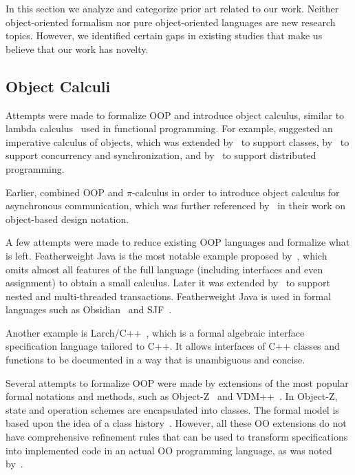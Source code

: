 
In this section we analyze and categorize prior art related to our work.
Neither object-oriented formalism nor pure object-oriented languages are new research topics.
However, we identified certain gaps in existing studies that make us believe that our work has novelty.

\subsection{Object Calculi}

Attempts were made to formalize OOP and introduce object calculus, similar to lambda calculus~\citep{barendregt2012} used in functional programming.
For example, \citet{abadi1995imperative} suggested an imperative calculus of objects, which was extended by~\citet{bono1998imperative} to support classes, by~\citet{gordon1998concurrent} to support concurrency and synchronization, and by~\citet{jeffrey1999distributed} to support distributed programming.

Earlier, \citet{honda1991object} combined OOP and \(\pi\)-calculus in order to introduce object calculus for asynchronous communication, which was further referenced by~\citet{jones1993pi} in their work on object-based design notation.

A few attempts were made to reduce existing OOP languages and formalize what is left.
Featherweight Java is the most notable example proposed by~\citet{igarashi2001featherweight}, which omits almost all features of the full language (including interfaces and even assignment) to obtain a small calculus.
Later it was extended by~\citet{jagannathan2005transactional} to support nested and multi-threaded transactions.
Featherweight Java is used in formal languages such as Obsidian~\citep{coblenz2019} and SJF~\citep{usov2020}.

Another example is Larch/C++~\citep{cheon1994quick}, which is a formal algebraic interface specification language tailored to C++.
It allows interfaces of C++ classes and functions to be documented in a way that is unambiguous and concise.

Several attempts to formalize OOP were made by extensions of the most popular formal notations and methods, such as Object-Z~\citep{duke1991object} and VDM++~\citep{durr1992vdm}.
In Object-Z, state and operation schemes are encapsulated into classes.
The formal model is based upon the idea of a class history~\citep{duke1990towards}.
However, all these OO extensions do not have comprehensive refinement rules that can be used to transform specifications into implemented code in an actual OO programming language, as was noted by~\citet{paige1999object}.

